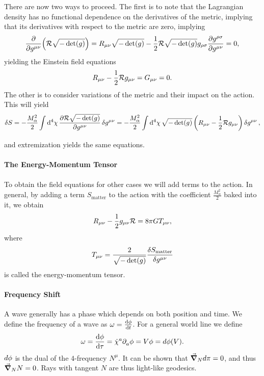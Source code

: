 There are now two ways to proceed. The first is to note that the Lagrangian density has no functional dependence on the derivatives of the metric, implying that its derivatives with respect to the metric are zero, implying
\begin{align*}
	\pdv{g^{\mu\nu}}(\mathcal{R}\sqrt{-\det(g)}) = R_{\mu\nu}\sqrt{-\det(g)} - \frac{1}{2}\mathcal{R}\sqrt{-\det(g)}g_{\rho\sigma}\pdv{g^{\rho\sigma}}{g^{\mu\nu}} = 0,
\end{align*}
yielding the Einstein field equations
\begin{align*}
	R_{\mu\nu} - \frac{1}{2}\mathcal{R} g_{\mu\nu} = G_{\mu\nu} = 0.
\end{align*}
The other is to consider variations of the metric and their impact on the action. This will yield
\begin{align*}
	\var{S} = -\frac{M_{\alpha}^{2}}{2}\int\limits_{}^{}\dd[4]{\chi}\pdv{\ensuremath{\mathcal{R}}\sqrt{-\det(g)}}{g^{\mu\nu}}\var{g^{\mu\nu}} = -\frac{M_{\alpha}^{2}}{2}\int\limits_{}^{}\dd[4]{\chi}\sqrt{-\det(g)}\left(R_{\mu\nu} - \frac{1}{2}\mathcal{R} g_{\mu\nu}\right)\var{g^{\mu\nu}},
\end{align*}
and extremization yields the same equations.

\paragraph{The Energy-Momentum Tensor}
To obtain the field equations for other cases we will add terms to the action. In general, by adding a term $S_{\text{matter}}$ to the action with the coefficient $\frac{M_{\alpha}^{2}}{2}$ baked into it, we obtain
\begin{align*}
	R_{\mu\nu} - \frac{1}{2}g_{\mu\nu}\mathcal{R} = 8\pi GT_{\mu\nu},
\end{align*}
where
\begin{align*}
	T_{\mu\nu} = \frac{2}{\sqrt{-\det(g)}}\fdv{S_{\text{matter}}}{g^{\mu\nu}}
\end{align*}
is called the energy-momentum tensor.

\paragraph{Frequency Shift}
A wave generally has a phase which depends on both position and time. We define the frequency of a wave as $\omega = \dv{\phi}{t}$. For a general world line we define
\begin{align*}
	\omega = \dv{\phi}{\tau} = \dot{\chi}^{a}\partial^{}_{a}\phi = V\phi = d\phi(V).
\end{align*}
$d\phi$ is the dual of the $4$-frequency $N^{\mu}$. It can be shown that $\grad_{N}{d\pi} = 0$, and thus $\grad_{N}{N} = 0$. Rays with tangent $N$ are thus light-like geodesics.

